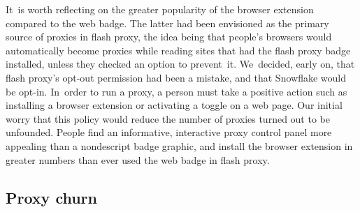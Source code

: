 \documentclass[letterpaper,twocolumn]{article}
\begin{document}
It~is worth reflecting
on the greater popularity of the browser extension
compared to the web badge.
The latter had been envisioned
as the primary source of proxies in flash proxy,
the idea being that people's browsers
would automatically become proxies
while reading sites that had the flash proxy badge installed,
unless they checked an option to prevent~it.
We~decided, early on, that flash proxy's opt-out permission had been a mistake,
%
and that Snowflake would be opt-in.
In~order to run a proxy, a person must take a positive action
such as installing a browser extension
or activating a toggle on a web page.
Our initial worry that this policy
would reduce the number of proxies turned out to be unfounded.
People find an informative, interactive proxy control panel more appealing
than a nondescript badge graphic,
and install the browser extension in greater numbers
than ever used the web badge in flash proxy.

\subsection{Proxy churn}
\label{sec:proxy-churn}

\end{document}
